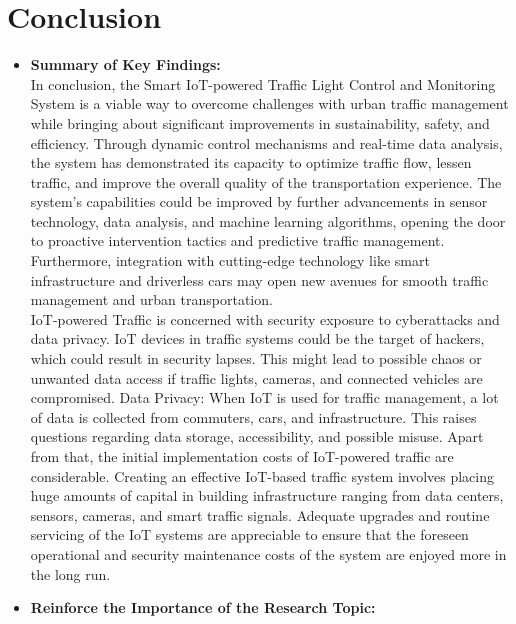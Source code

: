 \documentclass[12pt,a4paper]{article}
\begin{document}
\section{Conclusion}

\begin{itemize}
    \item \textbf{Summary of Key Findings:}\\
    
    In conclusion, the Smart IoT-powered Traffic Light Control and Monitoring System is a viable way to overcome challenges with urban traffic management while bringing about significant improvements in sustainability, safety, and efficiency. Through dynamic control mechanisms and real-time data analysis, the system has demonstrated its capacity to optimize traffic flow, lessen traffic, and improve the overall quality of the transportation experience. The system's capabilities could be improved by further advancements in sensor technology, data analysis, and machine learning algorithms, opening the door to proactive intervention tactics and predictive traffic management. Furthermore, integration with cutting-edge technology like smart infrastructure and driverless cars may open new avenues for smooth traffic management and urban transportation.\\
    
    IoT-powered Traffic is concerned with security exposure to cyberattacks and data privacy. IoT devices in traffic systems could be the target of hackers, which could result in security lapses. This might lead to possible chaos or unwanted data access if traffic lights, cameras, and connected vehicles are compromised. Data Privacy: When IoT is used for traffic management, a lot of data is collected from commuters, cars, and infrastructure. This raises questions regarding data storage, accessibility, and possible misuse. Apart from that, the initial implementation costs of IoT-powered traffic are considerable. Creating an effective IoT-based traffic system involves placing huge amounts of capital in building infrastructure ranging from data centers, sensors, cameras, and smart traffic signals. Adequate upgrades and routine servicing of the IoT systems are appreciable to ensure that the foreseen operational and security maintenance costs of the system are enjoyed more in the long run. \\
    
    \item \textbf{Reinforce the Importance of the Research Topic:}\\
    

\end{itemize}
\end{document}
